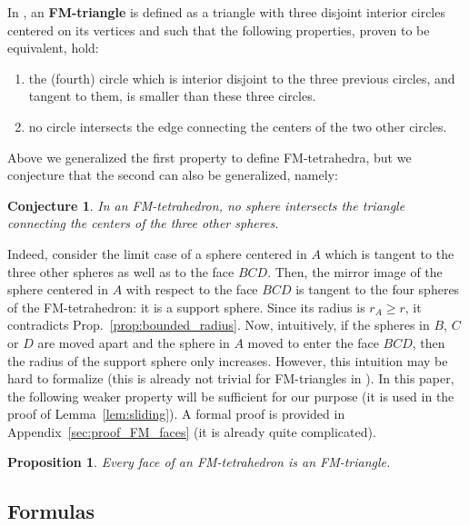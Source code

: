 \documentclass[11pt]{article}
\newtheorem{proposition}{Proposition}
\newtheorem{conjecture}{Conjecture}
\begin{document}
In \cite{FM58}, an {\bf FM-triangle} is defined as a triangle with three disjoint interior circles centered on its vertices and such that the following properties, proven to be equivalent, hold:
\begin{enumerate}
\item the (fourth) circle which is interior disjoint to the three previous circles, and tangent to them, is smaller than these three circles.
\item no circle intersects the edge connecting the centers of the two other circles.
\end{enumerate}
Above we generalized the first property to define FM-tetrahedra, but we conjecture that the second can also be generalized, namely:

\begin{conjecture}
\label{conj:sphere_sector}
In an FM-tetrahedron, no sphere intersects the triangle connecting the centers of the three other spheres.
\end{conjecture}

Indeed, consider the limit case of a sphere centered in $A$ which is tangent to the three other spheres as well as to the face $BCD$.
Then, the mirror image of the sphere centered in $A$ with respect to the face $BCD$ is tangent to the four spheres of the FM-tetrahedron: it is a support sphere.
Since its radius is $r_A\geq r$, it contradicts Prop.~\ref{prop:bounded_radius}.
Now, intuitively, if the spheres in $B$, $C$ or $D$ are moved apart and the sphere in $A$ moved to enter the face $BCD$, then the radius of the support sphere only increases.
However, this intuition may be hard to formalize (this is already not trivial for FM-triangles in \cite{FM58}).
In this paper, the following weaker property will be sufficient for our purpose (it is used in the proof of Lemma~\ref{lem:sliding}).
A formal proof is provided in Appendix~\ref{sec:proof_FM_faces} (it is already quite complicated).

\begin{proposition}
\label{prop:FM_faces}
Every face of an FM-tetrahedron is an FM-triangle.
\end{proposition}




\subsection{Formulas}
\label{sec:formulas}
\end{document}
